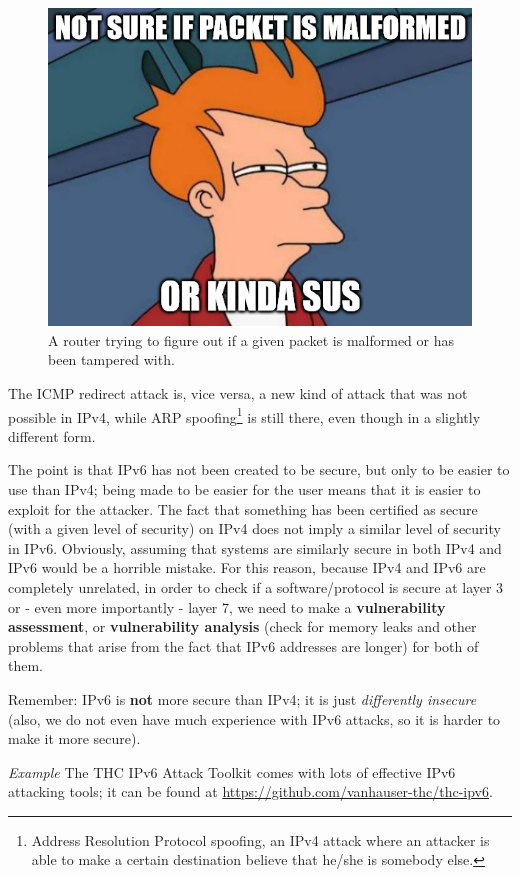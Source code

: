 \begin{figure}[h]
    \centering
    \includegraphics[scale=0.6]{img/fry_packet.png}
    \decoRule
    \caption{A router trying to figure out if a given packet is malformed or has been tampered with.}
    \label{fig:fry_packet}
\end{figure}

The ICMP redirect attack is, vice versa, a new kind of attack that was not possible in IPv4, while ARP spoofing\footnote{Address Resolution Protocol spoofing, an IPv4 attack where an attacker is able to make a certain destination believe that he/she is somebody else.} is still there, even though in a slightly different form.

The point is that IPv6 has not been created to be secure, but only to be easier to use than IPv4; being made to be easier for the user means that it is easier to exploit for the attacker. The fact that something has been certified as secure (with a given level of security) on IPv4 does not imply a similar level of security in IPv6. Obviously, assuming that systems are similarly secure in both IPv4 and IPv6 would be a horrible mistake. For this reason, because IPv4 and IPv6 are completely unrelated, in order to check if a software/protocol is secure at layer 3 or - even more importantly - layer 7, we need to make a \textbf{vulnerability assessment}, or \textbf{vulnerability analysis} (check for memory leaks and other problems that arise from the fact that IPv6 addresses are longer) for both of them.

Remember: IPv6 is \textbf{not} more secure than IPv4; it is just \textit{differently insecure} (also, we do not even have much experience with IPv6 attacks, so it is harder to make it more secure).

\vspace{0.5em}

\emph{Example} The THC IPv6 Attack Toolkit comes with lots of effective IPv6 attacking tools; it can be found at \url{https://github.com/vanhauser-thc/thc-ipv6}.

\vspace{0.5em}